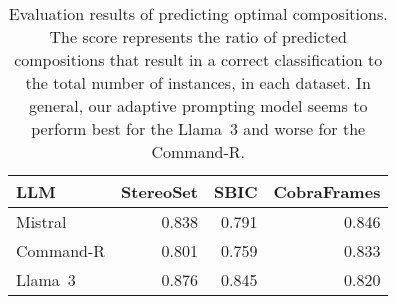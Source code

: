 \begin{table}
    \small
    \centering
    \begin{tabular}{l@{}rrr}
        \toprule
        \textbf{LLM} & \textbf{StereoSet} & \textbf{SBIC} & \textbf{CobraFrames} \\
        \midrule
        Mistral & 0.838 & 0.791 & 0.846 \\
        Command-R & 0.801 & 0.759 & 0.833 \\
        Llama~3 & 0.876 & 0.845 & 0.820 \\

        \bottomrule
    \end{tabular}

    \caption{Evaluation results of predicting optimal compositions. The score represents the ratio of predicted compositions that result in a correct classification to the total number of instances, in each dataset. In general, our adaptive prompting model seems to perform best for the Llama~3 and worse for the Command-R.}
    \label{tab:composition-prediction-performance-results}
\end{table}
